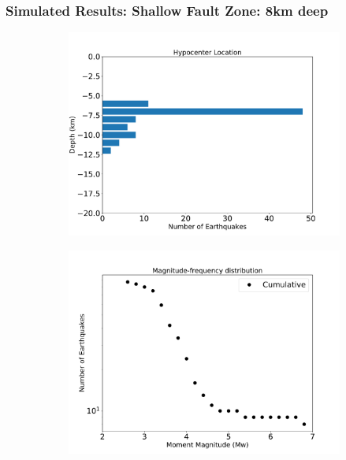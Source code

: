 \documentclass{beamer}
\begin{document}
\begin{frame}
    \frametitle{Simulated Results: Shallow Fault Zone: 8km deep }
    \begin{figure}
        \begin{subfigure}[b]{0.5\textwidth}
            \includegraphics[width=\textwidth]{images/shallowfz.pdf} 
        \end{subfigure}%
        \begin{subfigure}[b]{0.5\textwidth}
            \includegraphics[width=\textwidth]{images/shallowfz_mfd.pdf}
        \end{subfigure}%
    \end{figure}
\end{frame}
\end{document}
